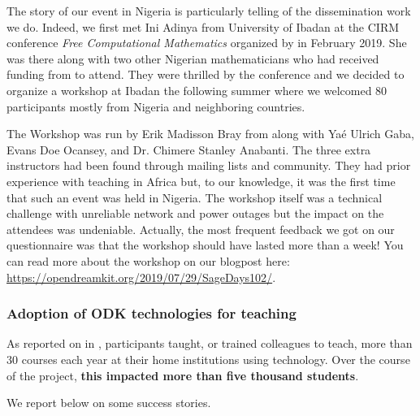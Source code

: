 \begin{enumerate}
  The story of our event in Nigeria is particularly telling of the 
  dissemination work we do. Indeed, we first met Ini Adinya from University of Ibadan at the
  CIRM conference \emph{Free Computational Mathematics} organized by \ODK in February 2019. She 
  was there along with two other Nigerian mathematicians who had received funding from \ODK to attend. 
  They were thrilled by the conference and we decided to organize a \Sage workshop at Ibadan the 
  following summer where we welcomed 80 participants mostly from Nigeria and neighboring countries.
  
  The Workshop was run by Erik Madisson Bray from \ODK along with Yaé Ulrich Gaba, Evans Doe Ocansey, and Dr. Chimere 
  Stanley Anabanti. The three extra instructors had been found through \Sage mailing lists and community. They had prior
  experience with teaching \Sage in Africa but, to our knowledge, it was the first time that such an event was held in Nigeria.
  The workshop itself was a technical challenge with unreliable network and power outages but the impact on the attendees was
  undeniable. Actually, the most frequent feedback we got on our questionnaire was that the workshop should have lasted more than 
  a week! You can read more about the workshop on our blogpost here: \url{https://opendreamkit.org/2019/07/29/SageDays102/}.
\end{enumerate}

\subsubsection{Adoption of ODK technologies for teaching}

As reported on in , \OpenDreamKit
participants taught, or trained colleagues to teach, more than 30
courses each year at their home institutions using \OpenDreamKit
technology. Over the course of the project, \textbf{this impacted more
  than five thousand students}.

We report below on some success stories.


